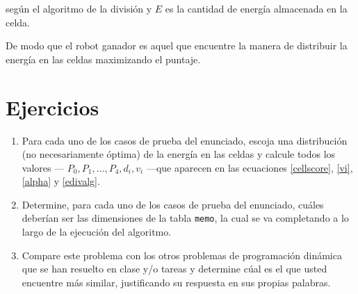 según el algoritmo de la división y $E$ es la cantidad de energía almacenada en
la celda.

\bigskip
De modo que el robot ganador es aquel que encuentre la manera de distribuir la energía
en las celdas maximizando el puntaje.

%

\section{Ejercicios}
\begin{enumerate}
	\item Para cada uno de los casos de prueba del enunciado, escoja una distribución
		(no necesariamente óptima) de la energía en las celdas y calcule todos los valores
		---
		\(
			P_0, P_1, \ldots, P_4, d_i, v_i
		\)
		---que aparecen en las ecuaciones \eqref{cellscore}, \eqref{vi}, \eqref{alpha} y
		\eqref{edivalg}.
	\item Determine, para cada uno de los casos de prueba del enunciado, cuáles deberían ser
		las dimensiones de la tabla \texttt{memo}, la cual se va completando a lo largo de
		la ejecución del algoritmo.
	\item Compare este problema con los otros problemas de programación dinámica que se han
		resuelto en clase y/o tareas y determine cúal es el que usted encuentre más similar,
		justificando su respuesta en sus propias palabras.
\end{enumerate}


